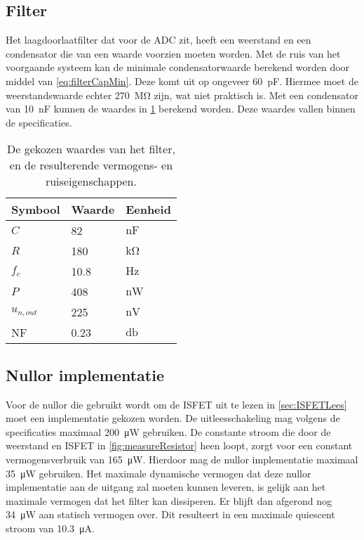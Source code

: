 \subsection{Filter}
Het laagdoorlaatfilter dat voor de ADC zit, heeft een weerstand en een condensator die van een waarde voorzien moeten worden.
Met de ruis van het voorgaande systeem kan de minimale condensatorwaarde berekend worden door middel van \cref{eq:filterCapMin}. Deze komt uit op ongeveer \qty{60}{\pico\farad}. Hiermee moet de weerstandswaarde echter \qty{270}{\mega\ohm} zijn, wat niet praktisch is. Met een condensator van \qty{10}{\nano\farad} kunnen de waardes in \cref{tab:filterValues} berekend worden. Deze waardes vallen binnen de specificaties.

\begin{table}[ht]
    \centering
    \begin{tabular}{l|l|l}
        Symbool & Waarde & Eenheid \\
        \hline
        $C$         & 82    & $\si{\nano\farad}$\\
        $R$         & 180   & $\si{\kilo\ohm}$  \\
        $f_c$       & 10.8  & $\si{\hertz}$     \\
        $P$         & 408   & $\si{\nano\watt}$ \\
        $u_{n,out}$ & 225   & $\si{\nano\volt}$ \\
        NF          & 0.23  & $\si{\decibel}$   \\
    \end{tabular}
    \caption{De gekozen waardes van het filter, en de resulterende vermogens- en ruiseigenschappen.}
    \label{tab:filterValues}
\end{table}


\subsection{Nullor implementatie}
Voor de nullor die gebruikt wordt om de ISFET uit te lezen in \cref{sec:ISFETLees} moet een implementatie gekozen worden. De uitleesschakeling mag volgens de specificaties maximaal \qty{200}{\micro\watt}  gebruiken. De constante stroom die door de weerstand en ISFET in \cref{fig:measureResistor} heen loopt, zorgt voor een constant vermogensverbruik van \qty{165}{\micro\watt}. Hierdoor mag de nullor implementatie maximaal \qty{35}{\micro\watt} gebruiken. Het maximale dynamische vermogen dat deze nullor implementatie aan de uitgang zal moeten kunnen leveren, is gelijk aan het maximale vermogen dat het filter kan dissiperen. Er blijft dan afgerond nog \qty{34}{\micro\watt} aan statisch vermogen over. Dit resulteert in een maximale quiescent stroom van \qty{10.3}{\micro\ampere}.

